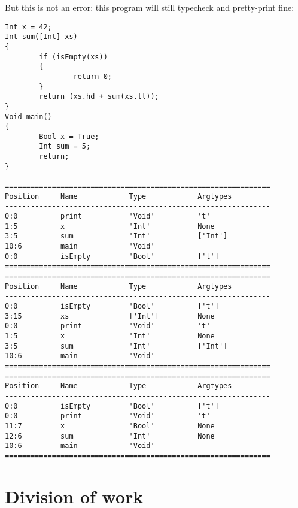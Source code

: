 \documentclass[a4paper]{article}
\begin{document}
But this is not an error: this program will still typecheck and pretty-print fine: 
\begin{verbatim}
Int x = 42;
Int sum([Int] xs)
{
        if (isEmpty(xs))
        {
                return 0;
        }
        return (xs.hd + sum(xs.tl));
}
Void main()
{
        Bool x = True;
        Int sum = 5;
        return;
}

==============================================================
Position     Name            Type            Argtypes            
--------------------------------------------------------------
0:0          print           'Void'          't'                 
1:5          x               'Int'           None                
3:5          sum             'Int'           ['Int']             
10:6         main            'Void'                              
0:0          isEmpty         'Bool'          ['t']               
==============================================================
==============================================================
Position     Name            Type            Argtypes            
--------------------------------------------------------------
0:0          isEmpty         'Bool'          ['t']               
3:15         xs              ['Int']         None                
0:0          print           'Void'          't'                 
1:5          x               'Int'           None                
3:5          sum             'Int'           ['Int']             
10:6         main            'Void'                              
==============================================================
==============================================================
Position     Name            Type            Argtypes            
--------------------------------------------------------------
0:0          isEmpty         'Bool'          ['t']               
0:0          print           'Void'          't'                 
11:7         x               'Bool'          None                
12:6         sum             'Int'           None                
10:6         main            'Void'                              
==============================================================
\end{verbatim}


\newpage %
\section{Division of work}
\end{document}
